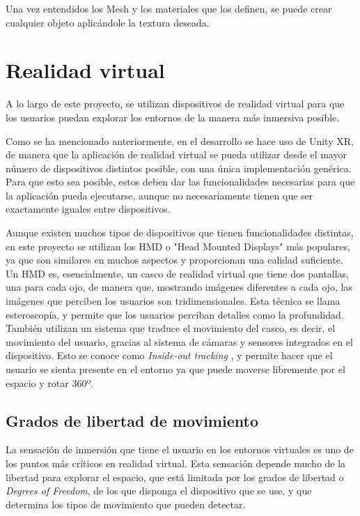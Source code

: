 \documentclass[../main.tex]{subfiles}
\begin{document}
Una vez entendidos los Mesh y los materiales que los definen, se puede crear cualquier objeto aplicándole la textura deseada.

\section{Realidad virtual}

A lo largo de este proyecto, se utilizan dispositivos de realidad virtual para que los usuarios puedan explorar los entornos de la manera más inmersiva posible.

Como se ha mencionado anteriormente, en el desarrollo se hace uso de Unity XR, de manera que la aplicación de realidad virtual se pueda utilizar desde el mayor número de dispositivos distintos posible, con una única implementación genérica. Para que esto sea posible, estos deben dar las funcionalidades necesarias para que la aplicación pueda ejecutarse, aunque no necesariamente tienen que ser exactamente iguales entre dispositivos.

Aunque existen muchos tipos de dispositivos que tienen funcionalidades distintas, en este proyecto se utilizan los HMD  o "\uppercase{H}ead Mounted Displays" más populares, ya que son similares en muchos aspectos y proporcionan una calidad suficiente. Un HMD es, esencialmente, un casco de realidad virtual que tiene dos pantallas, una para cada ojo, de manera que, mostrando imágenes diferentes a cada ojo, las imágenes que perciben los usuarios son tridimensionales. Esta técnica se llama esteroscopía, y permite que los usuarios perciban detalles como la profundidad. También utilizan un sistema que traduce el movimiento del casco, es decir, el movimiento del usuario, gracias al sistema de cámaras y sensores integrados en el dispositivo. Esto se conoce como \textit{\uppercase{I}nside-out tracking} \cite{Inside_Out_Tracking}, y permite hacer que el usuario se sienta presente en el entorno ya que puede moverse libremente por el espacio y rotar 360º.

\subsection{Grados de libertad de movimiento}

La sensación de inmersión que tiene el usuario en los entornos virtuales es uno de los puntos más críticos en realidad virtual. 
Esta sensación depende mucho de la libertad para explorar el espacio, que está limitada por los grados de libertad o \textit{Degrees of Freedom}, de los que disponga el dispositivo que se use, y que determina los tipos de movimiento que pueden detectar.
\end{document}
